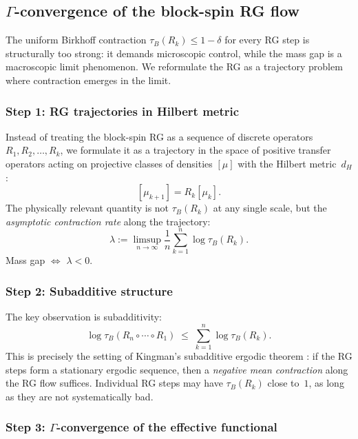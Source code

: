 \documentclass[12pt,a4paper]{article}
\theoremstyle{definition}
\theoremstyle{plain}
\theoremstyle{remark}
\begin{document}
\subsection{$\Gamma$-convergence of the block-spin RG flow}\label{sec:gamma-rg}

The uniform Birkhoff contraction $\tau_B(R_k) \leq 1 - \delta$ for every RG step is structurally too strong: it demands microscopic control, while the mass gap is a macroscopic limit phenomenon. We reformulate the RG as a trajectory problem where contraction emerges in the limit.

\subsubsection*{Step 1: RG trajectories in Hilbert metric}

Instead of treating the block-spin RG as a sequence of discrete operators $R_1, R_2, \ldots, R_k$, we formulate it as a trajectory in the space of positive transfer operators acting on projective classes of densities $[\mu]$ with the Hilbert metric~$d_H$:
\[
  [\mu_{k+1}] = R_k[\mu_k].
\]
The physically relevant quantity is not $\tau_B(R_k)$ at any single scale, but the \emph{asymptotic contraction rate} along the trajectory:
\begin{equation}\label{eq:lyapunov-rg}
  \lambda := \limsup_{n \to \infty} \frac{1}{n} \sum_{k=1}^{n} \log \tau_B(R_k).
\end{equation}
Mass gap $\Leftrightarrow$ $\lambda < 0$.

\subsubsection*{Step 2: Subadditive structure}

The key observation is subadditivity:
\begin{equation}\label{eq:subadditive}
  \log \tau_B(R_n \circ \cdots \circ R_1) \;\leq\; \sum_{k=1}^{n} \log \tau_B(R_k).
\end{equation}
This is precisely the setting of Kingman's subadditive ergodic theorem \cite{Kingman1968}: if the RG steps form a stationary ergodic sequence, then a \emph{negative mean contraction} along the RG flow suffices. Individual RG steps may have $\tau_B(R_k)$ close to~$1$, as long as they are not systematically bad.

\subsubsection*{Step 3: $\Gamma$-convergence of the effective functional}
\end{document}
